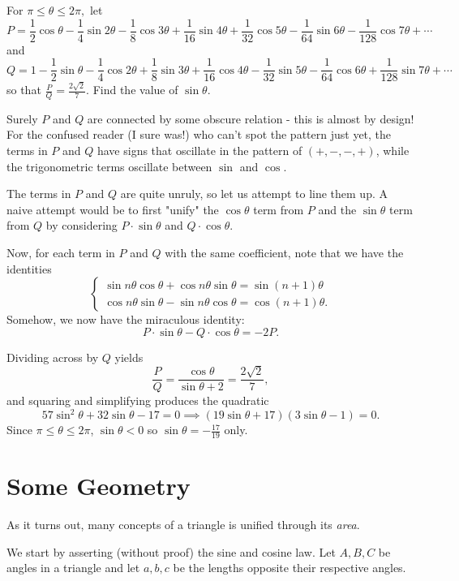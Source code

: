 \documentclass[../jarvis.tex]{subfiles}
\begin{document}
\begin{example}[2013 AIME I/14]
    For $\pi\leq\theta\leq2\pi,$ let
    $$P=\frac{1}{2}\cos{\theta}-\frac{1}{4}\sin{2\theta}-\frac{1}{8}\cos{3\theta}+\frac{1}{16}\sin{4\theta}+\frac{1}{32}\cos{5\theta}-\frac{1}{64}\sin{6\theta}-\frac{1}{128}\cos{7\theta}+\cdots$$
    and
    $$Q=1-\frac{1}{2}\sin{\theta}-\frac{1}{4}\cos{2\theta}+\frac{1}{8}\sin{3\theta}+\frac{1}{16}\cos{4\theta}-\frac{1}{32}\sin{5\theta}-\frac{1}{64}\cos{6\theta}+\frac{1}{128}\sin{7\theta}+\cdots$$
    so that $\frac{P}{Q}=\frac{2\sqrt{2}}{7}.$ Find the value of $\sin{\theta}$.
\end{example}
Surely $P$ and $Q$ are connected by some obscure relation - this is almost by design! For the confused reader (I sure was!) who can't spot the pattern just yet, the terms in $P$ and $Q$ have signs that oscillate in the pattern of $(+,-,-,+)$, while the trigonometric terms oscillate between $\sin$ and $\cos$.

The terms in $P$ and $Q$ are quite unruly, so let us attempt to line them up. A naive attempt would be to first "unify" the $\cos{\theta}$ term from $P$ and the $\sin{\theta}$ term from $Q$ by considering $P\cdot\sin{\theta}$ and $Q\cdot\cos{\theta}$.

Now, for each term in $P$ and $Q$ with the same coefficient, note that we have the identities
$$\begin{cases}
    \sin{n\theta}\cos{\theta}+\cos{n\theta}\sin{\theta}=\sin{(n+1)\theta} \\
    \cos{n\theta}\sin{\theta}-\sin{n\theta}\cos{\theta}=\cos{(n+1)\theta}.
\end{cases}$$
Somehow, we now have the miraculous identity:
$$P\cdot\sin{\theta}-Q\cdot\cos{\theta}=-2P.$$

Dividing across by $Q$ yields $$\frac{P}{Q}=\frac{\cos{\theta}}{\sin{\theta}+2}=\frac{2\sqrt{2}}{7},$$
and squaring and simplifying produces the quadratic
$$57\sin^2{\theta}+32\sin{\theta}-17=0 \implies (19\sin{\theta}+17)(3\sin{\theta}-1)=0.$$
Since $\pi\leq\theta\leq2\pi$, $\sin{\theta}<0$ so $\sin{\theta}=\boxed{-\frac{17}{19}}$ only.
\section{Some Geometry}
As it turns out, many concepts of a triangle is unified through its \textit{area}.

We start by asserting (without proof) the sine and cosine law. Let $A,B,C$ be angles in a triangle and let $a,b,c$ be the lengths opposite their respective angles.
\end{document}

